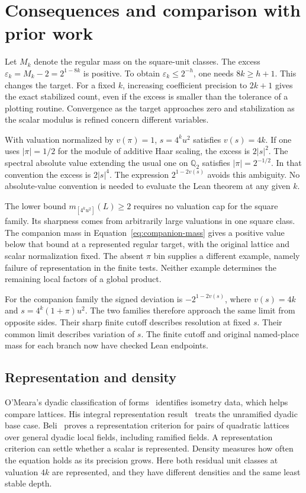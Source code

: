 \documentclass[12pt,letterpaper]{article}
\begin{document}
\section{Consequences and comparison with prior work}
Let $M_k$ denote the regular mass on the square-unit classes. The excess $\varepsilon_k=M_k-2=2^{1-8k}$ is positive. To obtain $\varepsilon_k\le2^{-h}$, one needs $8k\ge h+1$. This changes the target. For a fixed $k$, increasing coefficient precision to $2k+1$ gives the exact stabilized count, even if the excess is smaller than the tolerance of a plotting routine. Convergence as the target approaches zero and stabilization as the scalar modulus is refined concern different variables.

With valuation normalized by $v(\pi)=1$, $s=4^ku^2$ satisfies $v(s)=4k$. If one uses $|\pi|=1/2$ for the module of additive Haar scaling, the excess is $2|s|^2$. The spectral absolute value extending the usual one on $\mathbb Q_2$ satisfies $|\pi|=2^{-1/2}$. In that convention the excess is $2|s|^4$. The expression $2^{1-2v(s)}$ avoids this ambiguity. No absolute-value convention is needed to evaluate the Lean theorem at any given $k$.

The lower bound $m_{[4^ku^2]}(L)\ge2$ requires no valuation cap for the square family. Its sharpness comes from arbitrarily large valuations in one square class. The companion mass in Equation~\eqref{eq:companion-mass} gives a positive value below that bound at a represented regular target, with the original lattice and scalar normalization fixed. The absent $\pi$ bin supplies a different example, namely failure of representation in the finite tests. Neither example determines the remaining local factors of a global product.

For the companion family the signed deviation is $-2^{1-2v(s)}$, where $v(s)=4k$ and $s=4^k(1+\pi)u^2$. The two families therefore approach the same limit from opposite sides. Their sharp finite cutoff describes resolution at fixed $s$. Their common limit describes variation of $s$. The finite cutoff and original named-place mass for each branch now have checked Lean endpoints.


\subsection{Representation and density}
O'Meara's dyadic classification of forms~\cite{omeara1953} identifies isometry data, which helps compare lattices. His integral representation result~\cite{omeara1958} treats the unramified dyadic base case. Beli~\cite{beli2022} proves a representation criterion for pairs of quadratic lattices over general dyadic local fields, including ramified fields. A representation criterion can settle whether a scalar is represented. Density measures how often the equation holds as its precision grows. Here both residual unit classes at valuation $4k$ are represented, and they have different densities and the same least stable depth.
\end{document}
